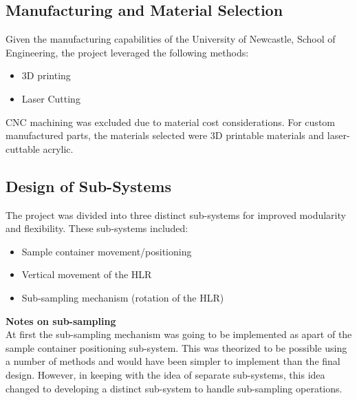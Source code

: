 \documentclass{UoNMCHA}
\numberwithin{equation}{section}
\begin{document}
\subsection{Manufacturing and Material Selection}\label{sub:Manufacturing and Material Selection}
Given the manufacturing capabilities of the University of Newcastle, School of Engineering, the project leveraged the following methods:\\
\begin{itemize}
	\item 3D printing
	\item Laser Cutting
\end{itemize}

CNC machining was excluded due to material cost considerations. For custom manufactured parts, the materials selected were 3D printable materials and laser-cuttable acrylic.\\


\subsection{Design of Sub-Systems}\label{sub:Design of Sub-Systems}
The project was divided into three distinct sub-systems for improved modularity and flexibility. These sub-systems included:\\
\begin{itemize}
	\item Sample container movement/positioning
	\item Vertical movement of the HLR
	\item Sub-sampling mechanism (rotation of the HLR)
\end{itemize}
\textbf{Notes on sub-sampling}\\
At first the sub-sampling mechanism was going to be implemented as apart of the sample container positioning sub-system. This was theorized to be possible using a number of methods and would have been simpler to implement than the final design. However, in keeping with the idea of separate sub-systems, this idea changed to developing a distinct sub-system to handle sub-sampling operations.\\
\end{document}
